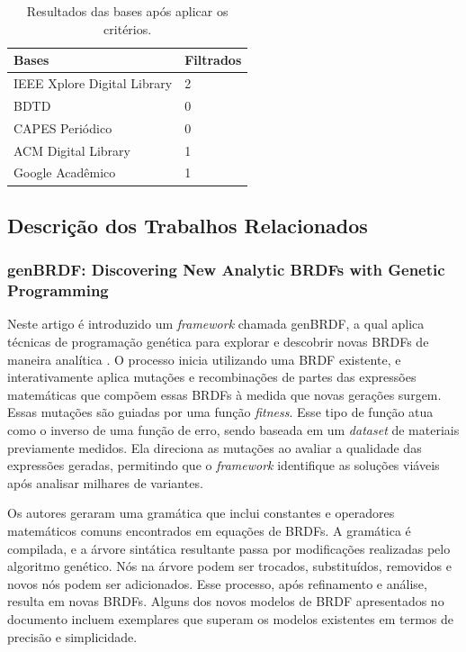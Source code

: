 \begin{table}[H]
\ABNTEXfontereduzida
  \caption{\small Resultados das bases após aplicar os critérios.}
\label{tab-result}
\begin{tabular}{p{6.6cm}|p{6.6cm}}
   \textbf{Bases}  & \textbf{Filtrados}\\
   \hline
    IEEE Xplore Digital Library
   & 2
    \\ \hline
    BDTD
    & 0
    \\ \hline
    CAPES Periódico
    & 0
    \\ \hline


  ACM Digital Library
  & 1
    \\ \hline
 Google Acadêmico 
  & 1
\end{tabular}
\end{table}






\subsection{Descrição dos Trabalhos Relacionados}


\subsubsection{genBRDF: Discovering New Analytic BRDFs with Genetic Programming}


Neste artigo é introduzido um \textit{framework} chamada genBRDF, a qual aplica técnicas de programação genética para explorar e descobrir novas BRDFs de maneira analítica \cite{genbrdf}. O processo inicia utilizando uma BRDF existente, e interativamente aplica mutações e recombinações de partes das expressões matemáticas que compõem essas BRDFs à medida que novas gerações surgem.
Essas mutações são guiadas por uma função \textit{fitness}.
Esse tipo de função atua como o inverso de uma função de erro, sendo baseada em um \textit{dataset} de materiais previamente medidos. Ela direciona as mutações ao avaliar a qualidade das expressões geradas, permitindo que o \textit{framework} identifique as soluções viáveis após analisar milhares de variantes.

Os autores geraram uma gramática que inclui constantes e operadores matemáticos comuns encontrados em equações de BRDFs. A gramática é compilada, e a árvore sintática resultante passa por modificações realizadas pelo algoritmo genético. Nós na árvore podem ser trocados, substituídos, removidos e novos nós podem ser adicionados. Esse processo, após refinamento e análise, resulta em novas BRDFs. Alguns dos novos modelos de BRDF apresentados no documento incluem exemplares que superam os modelos existentes em termos de precisão e simplicidade.
 
